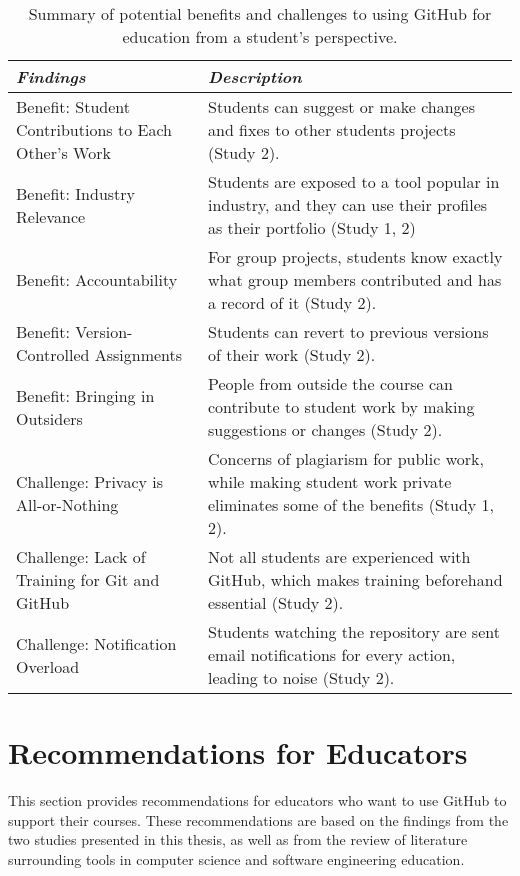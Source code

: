 \begin{table}[htp]
    \vspace{1pt}
        \caption{Summary of potential benefits and challenges to using GitHub for education from a student's perspective.}\label{table:findings:students}
    \vspace{1pt}
    \begin{center}
        \begin{tabular}{ | m{3cm} | m{12cm} | }
            \hline
            \emph{Findings} & \emph{Description} \\
            \hline
            Benefit: Student Contributions to Each Other’s Work & Students can suggest or make changes and fixes to other students projects (Study 2)​. \\
            \hline
            Benefit: Industry Relevance & Students are exposed to a tool popular in industry, and they can use their profiles as their portfolio (Study 1, 2)​ \\
            \hline
            Benefit: Accountability & For group projects, students know exactly what group members contributed and has a record of it (Study 2). \\
            \hline
            Benefit: Version-Controlled Assignments & Students can revert to previous versions of their work (Study 2). \\
            \hline
            Benefit: Bringing in Outsiders & People from outside the course can contribute to student work by making suggestions or changes (Study 2)​. \\
            \hline
            Challenge: Privacy is All-or-Nothing & Concerns of plagiarism for public work, while making student work private eliminates some of the benefits (Study 1, 2)​. \\
            \hline
            Challenge: Lack of Training for Git and GitHub & Not all students are experienced with GitHub, which makes training beforehand essential (Study 2)​. \\
            \hline
            Challenge: Notification Overload & Students watching the repository are sent email notifications for every action, leading to noise (Study 2).​ \\
            \hline
        \end{tabular}
    \end{center}
\end{table}

\section{Recommendations for Educators}
This section provides recommendations for educators who want to use GitHub to support their courses. These recommendations are based on the findings from the two studies presented in this thesis, as well as from the review of literature surrounding tools in computer science and software engineering education.

